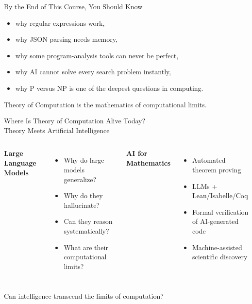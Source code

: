 \documentclass[10pt,aspectratio=169]{beamer}
\begin{document}
\begin{frame}{By the End of This Course, You Should Know}
\begin{itemize}
    \item why regular expressions work,
    \item why JSON parsing needs memory,
    \item why some program-analysis tools can never be perfect,
    \item why AI cannot solve every search problem instantly,
    \item why P versus NP is one of the deepest questions in computing.
\end{itemize}

\pause
\vspace{1em}
\begin{center}
\Large
\alert{Theory of Computation is the mathematics of computational limits.}
\end{center}
\end{frame}

\begin{frame}{Where Is Theory of Computation Alive Today?\\
Theory Meets Artificial Intelligence}

\begin{columns}[T]

\textbf{Large Language Models}

\begin{itemize}
\item Why do large models generalize?
\item Why do they hallucinate?
\item Can they reason systematically?
\item What are their computational limits?
\end{itemize}

\textbf{AI for Mathematics}

\begin{itemize}
\item Automated theorem proving
\item LLMs + Lean/Isabelle/Coq
\item Formal verification of AI-generated code
\item Machine-assisted scientific discovery
\end{itemize}

\end{columns}

\vfill

\begin{center}
\alert{Can intelligence transcend the limits of computation?}
\end{center}

\end{frame}
\end{document}
